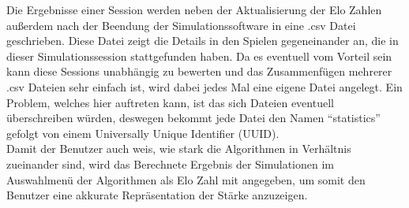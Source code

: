 \documentclass[12pt,a4paper,bibliography=totocnumbered,listof=totocnumbered]{article}
\begin{document}
Die Ergebnisse einer Session werden neben der Aktualisierung der Elo Zahlen außerdem nach der Beendung der Simulationssoftware in eine .csv Datei 
geschrieben. Diese Datei zeigt die Details in den Spielen gegeneinander an, die in dieser Simulationssession stattgefunden haben.
Da es eventuell vom Vorteil sein kann diese Sessions unabhängig zu bewerten und das Zusammenfügen mehrerer .csv Dateien sehr einfach ist, 
wird dabei jedes Mal eine eigene Datei angelegt. Ein Problem, welches hier auftreten kann, ist das sich Dateien eventuell überschreiben würden, deswegen 
bekommt jede Datei den Namen ``statistics'' gefolgt von einem Universally Unique Identifier (UUID).
\\
Damit der Benutzer auch weis, wie stark die Algorithmen in Verhältnis zueinander sind, wird das Berechnete Ergebnis der Simulationen im Auswahlmenü der 
Algorithmen als Elo Zahl mit angegeben, um somit den Benutzer eine akkurate Repräsentation der Stärke anzuzeigen.
\end{document}
